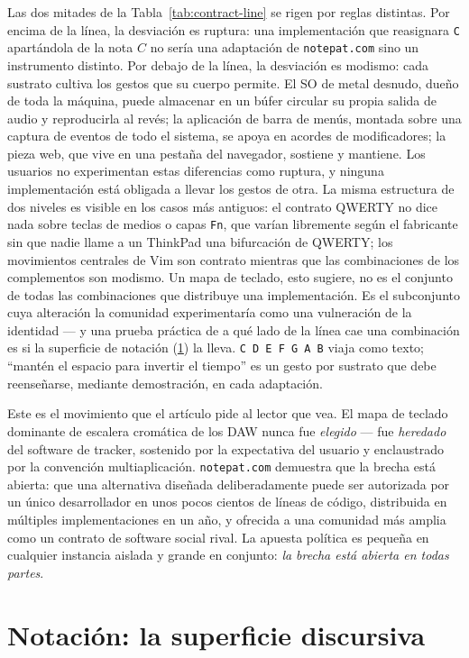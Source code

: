 \documentclass[10pt,letterpaper,twocolumn]{article}
\begin{document}
Las dos mitades de la Tabla~\ref{tab:contract-line} se rigen por reglas distintas. Por encima de la línea, la desviación es ruptura: una implementación que reasignara \texttt{C} apartándola de la nota $C$ no sería una adaptación de \texttt{notepat.com} sino un instrumento distinto. Por debajo de la línea, la desviación es modismo: cada sustrato cultiva los gestos que su cuerpo permite. El SO de metal desnudo, dueño de toda la máquina, puede almacenar en un búfer circular su propia salida de audio y reproducirla al revés; la aplicación de barra de menús, montada sobre una captura de eventos de todo el sistema, se apoya en acordes de modificadores; la pieza web, que vive en una pestaña del navegador, sostiene y mantiene. Los usuarios no experimentan estas diferencias como ruptura, y ninguna implementación está obligada a llevar los gestos de otra. La misma estructura de dos niveles es visible en los casos más antiguos: el contrato QWERTY no dice nada sobre teclas de medios o capas \texttt{Fn}, que varían libremente según el fabricante sin que nadie llame a un ThinkPad una bifurcación de QWERTY; los movimientos centrales de Vim son contrato mientras que las combinaciones de los complementos son modismo. Un mapa de teclado, esto sugiere, no es el conjunto de todas las combinaciones que distribuye una implementación. Es el subconjunto cuya alteración la comunidad experimentaría como una vulneración de la identidad --- y una prueba práctica de a qué lado de la línea cae una combinación es si la superficie de notación (\textsection\ref{sec:notation}) la lleva. \texttt{C D E F G A B} viaja como texto; ``mantén el espacio para invertir el tiempo'' es un gesto por sustrato que debe reenseñarse, mediante demostración, en cada adaptación.

Este es el movimiento que el artículo pide al lector que vea. El mapa de teclado dominante de escalera cromática de los DAW nunca fue \emph{elegido} --- fue \emph{heredado} del software de tracker, sostenido por la expectativa del usuario y enclaustrado por la convención multiaplicación. \texttt{notepat.com} demuestra que la brecha está abierta: que una alternativa diseñada deliberadamente puede ser autorizada por un único desarrollador en unos pocos cientos de líneas de código, distribuida en múltiples implementaciones en un año, y ofrecida a una comunidad más amplia como un contrato de software social rival. La apuesta política es pequeña en cualquier instancia aislada y grande en conjunto: \emph{la brecha está abierta en todas partes}.

\section{Notación: la superficie discursiva}
\label{sec:notation}
\end{document}
